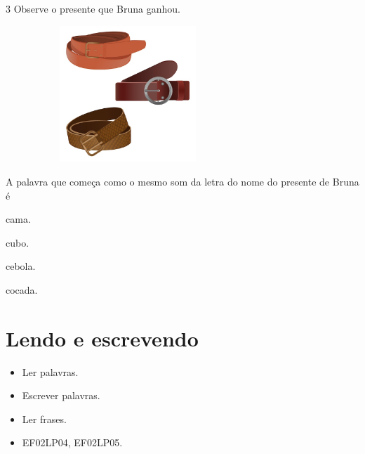 \num{3} Observe o presente que Bruna ganhou.

\includegraphics[width=3.62413in,height=2.01875in]{media/image48.jpeg}


A palavra que começa como o mesmo som da letra do nome do presente de Bruna é

\begin{escolha}
\item cama.

\item cubo.

\item cebola.

\item cocada.
\end{escolha}

\chapter{Lendo e escrevendo}


\begin{itemize}
\item Ler palavras.
\item Escrever palavras.
\item Ler frases.
\end{itemize}


\begin{itemize}
\item EF02LP04, EF02LP05.
\end{itemize}

